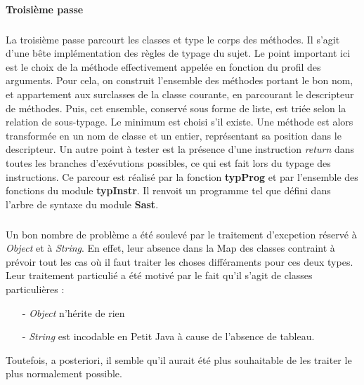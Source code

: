 \documentclass{article}
\begin{document}
\paragraph{Troisième passe}
\subparagraph*{}
La troisième passe parcourt les classes et type le corps des méthodes. Il s'agit d'une bête implémentation des règles de typage du sujet. Le point important ici est le choix de la méthode effectivement appelée en fonction du profil des arguments. Pour cela, on construit l'ensemble des méthodes portant le bon nom, et appartement aux surclasses de la classe courante, en parcourant le descripteur de méthodes. Puis, cet ensemble, conservé sous forme de liste, est triée selon la relation de sous-typage. Le minimum est choisi s'il existe. Une méthode est alors transformée en un nom de classe et un entier, représentant sa position dans le descripteur. Un autre point à tester est la présence d'une instruction \emph{return} dans toutes les branches d'exévutions possibles, ce qui est fait lors du typage des instructions. Ce parcour est réalisé par la fonction \textbf{typProg} et par l'ensemble des fonctions du module \textbf{typInstr}. Il renvoit un programme tel que défini dans l'arbre de syntaxe du module \textbf{Sast}.

\subparagraph*{} Un bon nombre de problème a été soulevé par le traitement d'excpetion réservé à \emph{Object} et à \emph{String}. En effet, leur absence dans la Map des classes contraint à prévoir tout les cas où il faut traiter les choses différaments pour ces deux types. Leur traitement particulié a été motivé par le fait qu'il s'agit de classes particulières : 
\begin{itemize}
\item[-] \emph{Object} n'hérite de rien
\item[-] \emph{String} est incodable en Petit Java à cause de l'absence de tableau.
\end{itemize}
Toutefois, a posteriori, il semble qu'il aurait été plus souhaitable de les traiter le plus normalement possible. 
\end{document}
